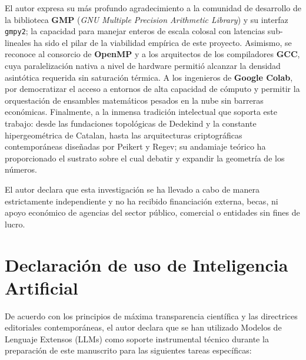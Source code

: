 \documentclass{article}
\numberwithin{equation}{section}
\theoremstyle{plain}
\theoremstyle{definition}
\begin{document}
\begin{ack}
El autor expresa su más profundo agradecimiento a la comunidad de desarrollo de la biblioteca \textbf{GMP} (\textit{GNU Multiple Precision Arithmetic Library}) y su interfaz \texttt{gmpy2}; la capacidad para manejar enteros de escala colosal con latencias sub-lineales ha sido el pilar de la viabilidad empírica de este proyecto. Asimismo, se reconoce al consorcio de \textbf{OpenMP} y a los arquitectos de los compiladores \textbf{GCC}, cuya paralelización nativa a nivel de hardware permitió alcanzar la densidad asintótica requerida sin saturación térmica. A los ingenieros de \textbf{Google Colab}, por democratizar el acceso a entornos de alta capacidad de cómputo y permitir la orquestación de ensambles matemáticos pesados en la nube sin barreras económicas. Finalmente, a la inmensa tradición intelectual que soporta este trabajo: desde las fundaciones topológicas de Dedekind y la constante hipergeométrica de Catalan, hasta las arquitecturas criptográficas contemporáneas diseñadas por Peikert y Regev; su andamiaje teórico ha proporcionado el sustrato sobre el cual debatir y expandir la geometría de los números.
\end{ack}

\begin{funding}
El autor declara que esta investigación se ha llevado a cabo de manera estrictamente independiente y no ha recibido financiación externa, becas, ni apoyo económico de agencias del sector público, comercial o entidades sin fines de lucro.
\end{funding}

\section*{Declaración de uso de Inteligencia Artificial}
De acuerdo con los principios de máxima transparencia científica y las directrices editoriales contemporáneas, el autor declara que se han utilizado Modelos de Lenguaje Extensos (LLMs) como soporte instrumental técnico durante la preparación de este manuscrito para las siguientes tareas específicas:
\end{document}
